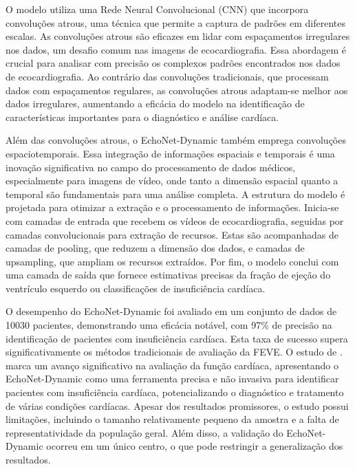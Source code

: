 O modelo utiliza uma Rede Neural Convolucional (CNN) que incorpora convoluções atrous, uma técnica  que permite a captura de padrões em diferentes escalas. As convoluções atrous são eficazes em lidar com espaçamentos irregulares nos dados, um desafio comum nas imagens de ecocardiografia. Essa abordagem  é crucial para analisar com precisão os complexos padrões encontrados nos dados de ecocardiografia. Ao contrário das convoluções tradicionais, que processam dados com espaçamentos regulares, as convoluções atrous adaptam-se melhor aos dados irregulares, aumentando a eficácia do modelo na identificação de características importantes para o diagnóstico e análise cardíaca.

Além das convoluções atrous, o EchoNet-Dynamic também emprega convoluções espaciotemporais. Essa integração de informações espaciais e temporais é uma inovação significativa no campo do processamento de dados médicos, especialmente para imagens de vídeo, onde tanto a dimensão espacial quanto a temporal são fundamentais para uma análise completa. A estrutura do modelo é projetada para otimizar a extração e o processamento de informações. Inicia-se com camadas de entrada que recebem os vídeos de ecocardiografia, seguidas por camadas convolucionais para extração de recursos. Estas são acompanhadas de camadas de pooling, que reduzem a dimensão dos dados, e camadas de upsampling, que ampliam os recursos extraídos. Por fim, o modelo conclui com uma camada de saída que fornece estimativas precisas da fração de ejeção do ventrículo esquerdo ou classificações de insuficiência cardíaca.

O desempenho do EchoNet-Dynamic foi avaliado em um conjunto de dados de 10030 pacientes, demonstrando uma eficácia notável, com 97\% de precisão na identificação de pacientes com insuficiência cardíaca. Esta taxa de sucesso supera significativamente os métodos tradicionais de avaliação da FEVE. O estudo de \textcite{Ouyang2020}. marca um avanço significativo na avaliação da função cardíaca, apresentando o EchoNet-Dynamic como uma ferramenta precisa e não invasiva para identificar pacientes com insuficiência cardíaca, potencializando o diagnóstico e tratamento de várias condições cardíacas. Apesar dos resultados promissores, o estudo possui limitações, incluindo o tamanho relativamente pequeno da amostra e a falta de representatividade da população geral. Além disso, a validação do EchoNet-Dynamic ocorreu em um único centro, o que pode restringir a generalização dos resultados. 


